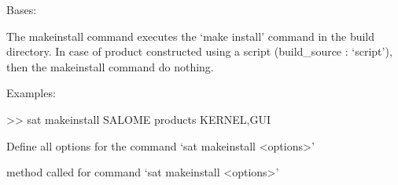 \documentclass[a4paper,10pt,english]{sphinxmanual}
\begin{document}
\begin{fulllineitems}
\label{\detokenize{apidoc_commands/commands:commands.makeinstall.Command}}
Bases: 

The makeinstall command executes the ‘make install’ command in the build directory.
In case of product constructed using a script (build\_source : ‘script’), 
then the makeinstall command do nothing.

\begin{DUlineblock}{0em}
\item[] Examples:
\item[] \textgreater{}\textgreater{} sat makeinstall SALOME \textendash{}products KERNEL,GUI
\end{DUlineblock}

\begin{fulllineitems}
\label{\detokenize{apidoc_commands/commands:commands.makeinstall.Command.getParser}}
Define all options for the command ‘sat makeinstall \textless{}options\textgreater{}’

\end{fulllineitems}


\begin{fulllineitems}
\label{\detokenize{apidoc_commands/commands:commands.makeinstall.Command.name}}
\end{fulllineitems}


\begin{fulllineitems}
\label{\detokenize{apidoc_commands/commands:commands.makeinstall.Command.run}}
method called for command ‘sat makeinstall \textless{}options\textgreater{}’

\end{fulllineitems}


\end{fulllineitems}
\end{document}
